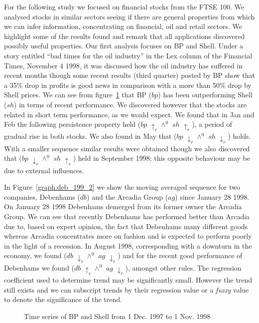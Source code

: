 For the following study we focused on financial stocks from the FTSE
100. We analysed stocks in similar sectors seeing if there are general
properties from which we can infer information, concentrating on
financial, oil and retail sectors. We highlight some of the results
found and remark that all applications discovered possibly useful
properties. Our first analysis
focuses on BP and Shell. Under a story entitled ``bad times for the
oil industry'' in the Lex column of the Financial Times, November 4
1998, it was discussed how the oil industry has suffered in recent
months though some recent results (third quarter) posted by BP show
that a 35\% drop in profits is good news in comparison with a more
than 50\% drop by Shell prices. We can see from
figure~\ref{graph:bp_11mn_1} that BP ($bp$) has been outperforming
Shell ($sh$) in
terms of recent performance. We discovered however that the stocks are
related in short term performance, as we would expect. We found that
in Jan and Feb the following persistence property held 
($bp$ $\uparrow_r \wedge^0$ $sh$ $\uparrow_r$), a period of gradual
rise in both stocks. We also found in May that  ($bp$
$\downarrow_r \wedge^0$ $sh$ $\downarrow_r$) holds. With a smaller
sequence similar results 
were obtained though we also discovered that  ($bp$ $\downarrow_r
\wedge^0$ $sh$ $\uparrow_r$) held in September 1998; this opposite behaviour
may be due to external influences.

\medskip

In Figure~\ref{graph:deb_199_2} we show the moving averaged sequence
for two companies, Debenhams ($db$) and the Arcadia Group ($ag$) since
January 28 1998. On January 28 1998 Debenhams demerged from its former
owner the
Arcadia Group. We can see that recently Debenhams has performed better
than Arcadia due to, based on expert opinion, the fact that Debenhams
many different goods whereas Arcadia concentrates more on fashion and
is expected to perform poorly in the light of a recession. In August
1998, corresponding with a downturn in the economy, we found
  ($db$ $\downarrow_r \wedge^0$ $ag$ $\downarrow_r$) and
for the recent good performance of Debenhams we found  ($db$
$\uparrow_r \wedge^0$ $ag$ $\downarrow_r$), amongst other rules. The
regression coefficient used to determine trend may be significantly
small. However the trend still exists and we can subscript trends by
their regression value or a {\em fuzzy} value to denote the
significance of the trend.

\begin{figure}
\centerline{}
\caption{\label{graph:bp_11mn_1}\scriptsize{Time series of BP and
Shell from 1 Dec. 1997 to 1 Nov. 1998}}
\end{figure}

